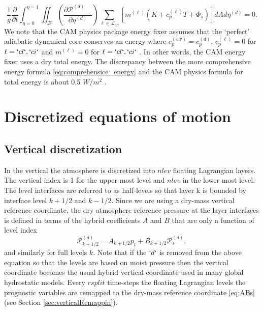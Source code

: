 \documentclass{agujournal}
\begin{document}
\begin{equation}
\frac{1}{g}\frac{\partial }{\partial t}\int_{\eta=0}^{\eta=1} \iint_\mathcal{D} \left( \frac{\partial \mathcal{P}^{(d)}\quad }{\partial \eta^{(d)}} \right)\sum_{\ell \in \mathcal{L}_{all}} \left[m^{(\ell)} \left(K+c_p^{(\ell)}T+\Phi_s  \right)\right]  dA d \eta^{(d)}=0.\label{eq:comprehensice_energy}
\end{equation}
We note that the CAM physics package energy fixer assumes that the `perfect' adiabatic dynamical core conserves an energy where $c_p^{(wv)}= c_p^{(d)}$, $c_p^{(\ell)}=0$ for $\ell=`cl`,`ci`$ and $m^{(\ell)}=0$ for $\ell=`cl`,`ci`$ \citep{WOHTTV2015JAMES}. In other words, the CAM energy fixer uses a dry total energy. The discrepancy between the more comprehensive energy formula \eqref{eq:comprehensice_energy} and the CAM physics formula for total energy is about 0.5 $W/m^2$ \citep{T2011LNCSEb}.

%



\section{Discretized equations of motion}\label{sec:discretized_eqs}
\subsection{Vertical discretization}
In the vertical the atmosphere is discretized into $nlev$ floating Lagrangian layers. The vertical index is 1 for the upper most level and $nlev$ in the lower most level. The level interfaces are referred to as half-levels so that layer k is bounded by interface level $k+1/2$ and $k-1/2$. Since we are using a dry-mass vertical reference coordinate, the dry atmosphere reference pressure at the layer interfaces is defined in terms of the hybrid coefficients $A$ and $B$
 that are only a function of level index
\begin{equation}
\mathcal{P}^{(d)}_{k+1/2}=A_{k+1/2}p_t+B_{k+1/2}\mathcal{P}_s^{(d)},\label{eq:ABs}
\end{equation}
and similarly for full levels $k$. Note that if the $`d`$ is removed from the above equation so that the levels are based on moist pressure then the vertical coordinate becomes the usual hybrid vertical coordinate used in many global hydrostatic models. Every $rsplit$ time-steps the floating Lagrangian levels the prognostic variables are remapped to the dry-mass reference coordinate \eqref{eq:ABs} (see Section \ref{sec:verticalRemappin}). 
\end{document}
